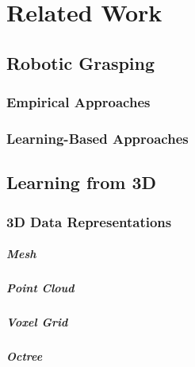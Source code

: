\chapter{Related Work}


\section{Robotic Grasping}

\subsection{Empirical Approaches}

\subsection{Learning-Based Approaches}


\section{Learning from 3D}

\subsection{3D Data Representations}
\paragraph{Mesh}
\paragraph{Point Cloud}
\paragraph{Voxel Grid}
\paragraph{Octree}

